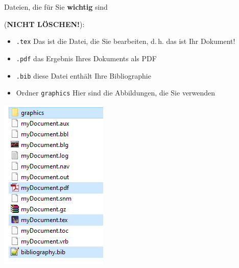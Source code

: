 \begin{frame}

\begin{minipage}{.58\textwidth}
	Dateien, die für Sie \textbf{wichtig} sind 
	
	(\textbf{NICHT LÖSCHEN!}):
	
	\begin{itemize}
		\item \texttt{.tex} \ras Das ist die Datei, die Sie bearbeiten, d.\,h. das ist Ihr Dokument!
		
		\item \texttt{.pdf} \ras das Ergebnis Ihres Dokuments als PDF
		
		\item \texttt{.bib} \ras diese Datei enthält Ihre Bibliographie
		
		\item Ordner \texttt{graphics} \ras Hier sind die Abbildungen, die Sie verwenden 
	\end{itemize}
	
\end{minipage}
%
\begin{minipage}{.40\textwidth}
	\centering
	\includegraphics[width=.9\linewidth]{../../texfiles-beamer/tex-material/WissArb-latex/latexDateien}
	
\end{minipage}

\end{frame}


